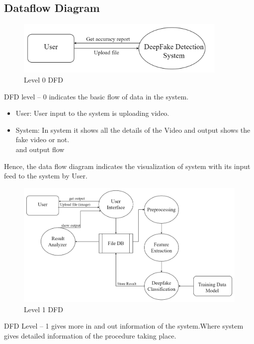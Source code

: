 
\subsection{Dataflow Diagram}
\begin{figure}[h]
    \centering
    \includegraphics[width= 4in ]{img/level0dfd.drawio.png}
    \caption{{Level 0 DFD}}
\end{figure}

\justify
DFD level – 0 indicates the basic flow of data in the system.
\begin{itemize}
    \item User: User input to the system is uploading video.
    \item System: In system it shows all the details of the Video and output shows the fake video or not. \\
          and output flow
\end{itemize}
Hence, the data flow diagram indicates the visualization of system with its input feed to the system by User.\\
\begin{figure}[h]
    \centering
    \includegraphics[width= 6in ]{img/level1dfd.drawio.png}
    \caption{{Level 1 DFD}}
\end{figure}
\justify
DFD Level – 1 gives more in and out information of the system.Where system gives detailed information of the procedure taking place.
